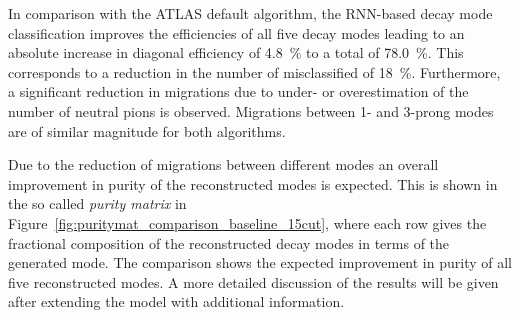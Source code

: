 In comparison with the ATLAS default algorithm, the RNN-based decay mode
classification improves the efficiencies of all five decay modes leading to an
absolute increase in diagonal efficiency of \SI{4.8}{\percent} to a total of
\SI{78.0}{\percent}. This corresponds to a reduction in the number of
misclassified \tauhadvis of \SI{18}{\percent}. Furthermore, a significant
reduction in migrations due to under- or overestimation of the number of neutral
pions is observed. Migrations between 1- and 3-prong modes are of similar
magnitude for both algorithms.

Due to the reduction of migrations between different modes an overall
improvement in purity of the reconstructed modes is expected. This is shown in
the so called \emph{purity matrix} in
Figure~\ref{fig:puritymat_comparison_baseline_15cut}, where each row gives the
fractional composition of the reconstructed decay modes in terms of the
generated mode. The comparison shows the expected improvement in purity of all
five reconstructed modes. A more detailed discussion of the results will be
given after extending the model with additional information.

